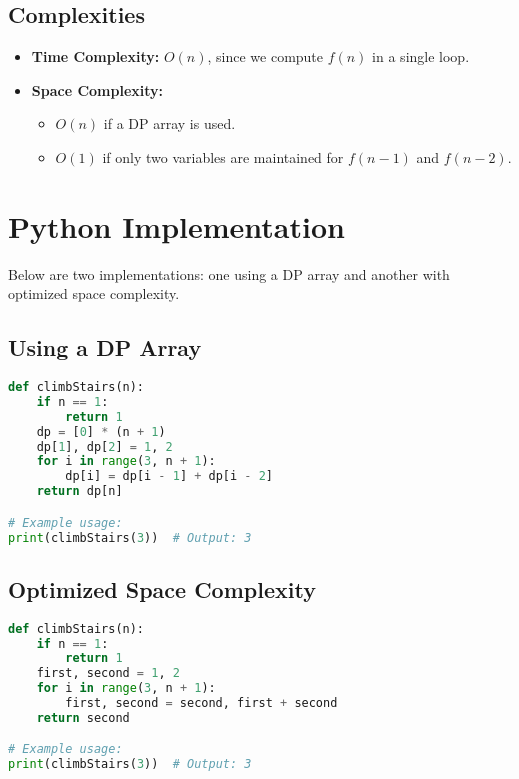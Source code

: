 \subsection*{Complexities}
\begin{itemize}
    \item \textbf{Time Complexity:} \( O(n) \), since we compute \( f(n) \) in a single loop.
    \item \textbf{Space Complexity:}
        \begin{itemize}
            \item \( O(n) \) if a DP array is used.
            \item \( O(1) \) if only two variables are maintained for \( f(n-1) \) and \( f(n-2) \).
        \end{itemize}
\end{itemize}

\section*{Python Implementation}
Below are two implementations: one using a DP array and another with optimized space complexity.

\subsection*{Using a DP Array}
\begin{fullwidth}
\begin{lstlisting}[language=Python]
def climbStairs(n):
    if n == 1:
        return 1
    dp = [0] * (n + 1)
    dp[1], dp[2] = 1, 2
    for i in range(3, n + 1):
        dp[i] = dp[i - 1] + dp[i - 2]
    return dp[n]

# Example usage:
print(climbStairs(3))  # Output: 3
\end{lstlisting}
\end{fullwidth}

\subsection*{Optimized Space Complexity}
\begin{fullwidth}
\begin{lstlisting}[language=Python]
def climbStairs(n):
    if n == 1:
        return 1
    first, second = 1, 2
    for i in range(3, n + 1):
        first, second = second, first + second
    return second

# Example usage:
print(climbStairs(3))  # Output: 3
\end{lstlisting}
\end{fullwidth}

